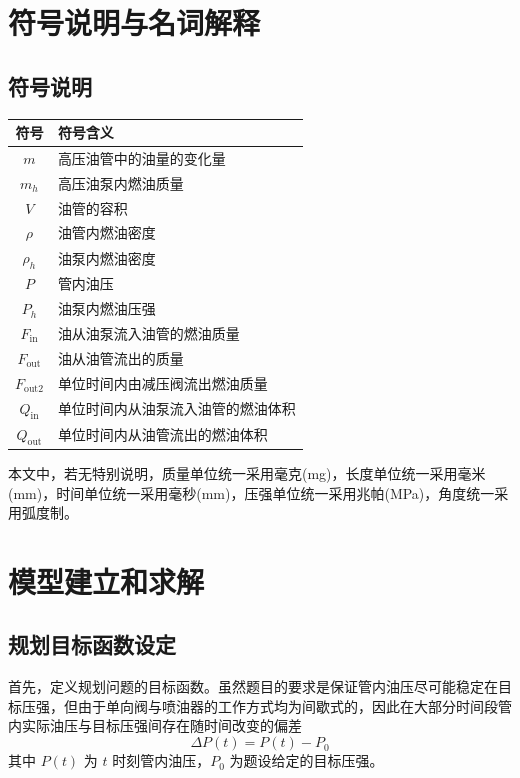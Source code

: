 \documentclass[12pt,a4paper]{article}
\begin{document}
\section{符号说明与名词解释}
\subsection{符号说明}
\begin{table}[h]
\centering
\begin{tabular}{cp{10cm}}

符号 & 符号含义\\\hline
$m$ & 高压油管中的油量的变化量\\
$m_h$ & 高压油泵内燃油质量\\
$V$ & 油管的容积\\
$\rho$ & 油管内燃油密度\\
$\rho_h$ & 油泵内燃油密度\\
$P$ & 管内油压\\
$P_h$ & 油泵内燃油压强\\
$F_{\text{in}}$ & 油从油泵流入油管的燃油质量\\
$F_{\text{out}}$ & 油从油管流出的质量\\
$F_{\text{out}2}$ & 单位时间内由减压阀流出燃油质量\\
$Q_{\text{in}}$ & 单位时间内从油泵流入油管的燃油体积\\
$Q_{\text{out}}$ & 单位时间内从油管流出的燃油体积\\
\end{tabular}
\end{table}
本文中，若无特别说明，质量单位统一采用毫克(mg)，长度单位统一采用毫米(mm)，时间单位统一采用毫秒(mm)，压强单位统一采用兆帕(MPa)，角度统一采用弧度制。

\section{模型建立和求解}
\subsection{规划目标函数设定}
首先，定义规划问题的目标函数。虽然题目的要求是保证管内油压尽可能稳定在目标压强，但由于单向阀与喷油器的工作方式均为间歇式的，因此在大部分时间段管内实际油压与目标压强间存在随时间改变的偏差
\begin{equation}
\Delta P(t)=P(t)-P_0
\end{equation}
其中 $P(t)$ 为 $t$ 时刻管内油压，$P_0$ 为题设给定的目标压强。
\end{document}
